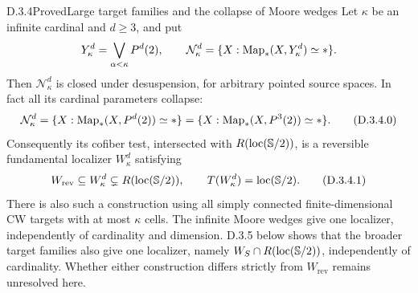 \begin{claim}{D.3.4}{Proved}{Large target families and the collapse of Moore wedges}
Let $\kappa$ be an infinite cardinal and $d\geq3$, and put
\[
 Y_\kappa^d=\bigvee_{\alpha<\kappa}P^d(2),\qquad
 \mathcal N_\kappa^d=
       \{X:\operatorname{Map}_*(X,Y_\kappa^d)\simeq *\}.
\]
Then $\mathcal N_\kappa^d$ is closed under desuspension, for
arbitrary pointed source spaces. In fact all its cardinal
parameters collapse:
\[
 \mathcal N_\kappa^d
   =\{X:\operatorname{Map}_*(X,P^d(2))\simeq *\}
   =\{X:\operatorname{Map}_*(X,P^3(2))\simeq *\}.
 \tag{D.3.4.0}
\]
Consequently its cofiber test,
intersected with $R(\operatorname{loc}(\mathbb S/2))$, is a reversible
fundamental localizer $W_\kappa^d$ satisfying
\[
 W_{\mathrm{rev}}\subseteq W_\kappa^d
       \subsetneq R(\operatorname{loc}(\mathbb S/2)),\qquad
 T(W_\kappa^d)=\operatorname{loc}(\mathbb S/2).
 \tag{D.3.4.1}
\]
There is also such a construction using all simply connected
finite-dimensional CW targets with at most $\kappa$ cells.
The infinite Moore wedges give one localizer, independently of
cardinality and dimension. D.3.5 below shows that the broader
target families also give one localizer, namely
$W_S\cap R(\operatorname{loc}(\mathbb S/2))$, independently of cardinality.
Whether either construction differs strictly from
$W_{\mathrm{rev}}$ remains unresolved here.
\end{claim}
